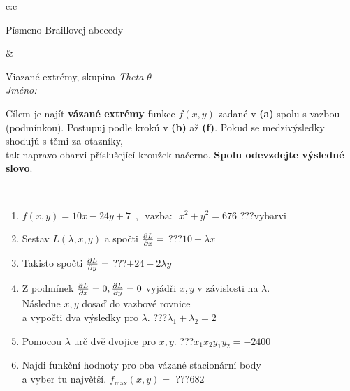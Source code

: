 \documentclass[10pt]{report}
\begin{document}
\begin{tabular}{c:c}
\begin{minipage}[c][104.5mm][t]{0.5\linewidth}
\begin{center}
\begin{minipage}{0.20\linewidth}
\begin{center}
{\small Písmeno Braillovej abecedy}
\end{center}
\end{minipage}
\end{center}
\end{minipage}
&
\begin{minipage}[c][104.5mm][t]{0.5\linewidth}
\begin{center}
\vspace{7mm}
{\huge Viazané extrémy, skupina \textit{Theta $\theta$} -}\\[5mm]
\textit{Jméno:}\phantom{xxxxxxxxxxxxxxxxxxxxxxxxxxxxxxxxxxxxxxxxxxxxxxxxxxxxxxxxxxxxxxxxx}\\[5mm]
\begin{minipage}{0.95\linewidth}
\begin{center}
Cílem je najít \textbf{vázané extrémy} funkce $f(x,y)$ zadané v \textbf{(a)} spolu s vazbou (podmínkou). Postupuj podle krokú v \textbf{(b)} až \textbf{(f)}. Pokud se medzivýsledky shodujú s těmi za otazníky,\\tak napravo obarvi příslušející kroužek načerno. \textbf{Spolu odevzdejte výsledné slovo}.
\end{center}
\end{minipage}
\\[1mm]
\begin{minipage}{0.79\linewidth}
\begin{center}
\begin{varwidth}{\linewidth}
\begin{enumerate}
\normalsize
\item $f(x,y)=10x-24y+7 \enspace , \enspace \mathrm{vazba:} \enspace x^2+y^2=676$\quad \dotfill\; ???\;\dotfill \quad vybarvi
\item Sestav $L(\lambda,x,y)$ a spočti $\pdv{L}{x}=$\quad \dotfill\; ???\;\dotfill \quad $10+\lambda x$
\item Takisto spočti $\pdv{L}{y}=$\quad \dotfill\; ???\;\dotfill \quad $+24+2\lambda y$
\item Z podmínek $\pdv{L}{x}=0 , \pdv{L}{y}=0$ vyjádři $x,y$ v závislosti na $\lambda$.\\ \phantom{xxxxxx}Následne $x,y$ dosaď do vazbové rovnice\\ \phantom{xxxxxx}a vypočti dva výsledky pro $\lambda$.\quad \dotfill\; ???\;\dotfill \quad $\lambda_1+\lambda_2=2$
\item Pomocou $\lambda$ urč dvě dvojice pro $x,y$.\quad \dotfill\; ???\;\dotfill \quad $x_1 x_2 y_1 y_2=-2400$
\item Najdi funkční hodnoty pro oba vázané stacionární body\\ \phantom{xxxxxx}a vyber tu najvětší. $f_{\text{max}}(x,y)=$\quad \dotfill\; ???\;\dotfill \quad $682$

\end{enumerate}
\end{varwidth}
\end{center}
\end{minipage}
\end{center}
\end{minipage}
\end{tabular}
\end{document}

